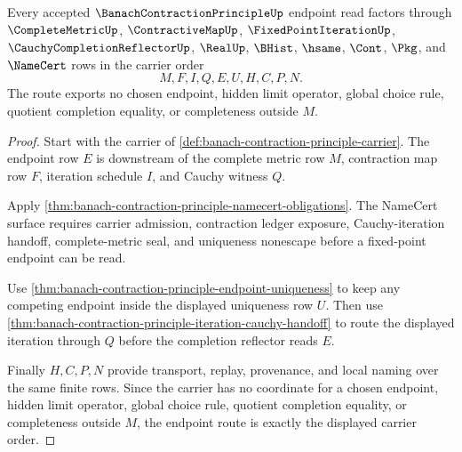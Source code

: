 \begin{theorem}
\label{thm:banach-contraction-principle-endpoint-route}
Every accepted $\BanachContractionPrincipleUp$ endpoint read factors through $\CompleteMetricUp$, $\ContractiveMapUp$, $\FixedPointIterationUp$, $\CauchyCompletionReflectorUp$, $\RealUp$, $\BHist$, $\hsame$, $\Cont$, $\Pkg$, and $\NameCert$ rows in the carrier order
$$
M,F,I,Q,E,U,H,C,P,N .
$$
The route exports no chosen endpoint, hidden limit operator, global choice rule, quotient completion equality, or completeness outside $M$.
\end{theorem}
\begin{proof}
Start with the carrier of \autoref{def:banach-contraction-principle-carrier}. The endpoint row $E$ is downstream of the complete metric row $M$, contraction map row $F$, iteration schedule $I$, and Cauchy witness $Q$.

Apply \autoref{thm:banach-contraction-principle-namecert-obligations}. The NameCert surface requires carrier admission, contraction ledger exposure, Cauchy-iteration handoff, complete-metric seal, and uniqueness nonescape before a fixed-point endpoint can be read.

Use \autoref{thm:banach-contraction-principle-endpoint-uniqueness} to keep any competing endpoint inside the displayed uniqueness row $U$. Then use \autoref{thm:banach-contraction-principle-iteration-cauchy-handoff} to route the displayed iteration through $Q$ before the completion reflector reads $E$.

Finally $H,C,P,N$ provide transport, replay, provenance, and local naming over the same finite rows. Since the carrier has no coordinate for a chosen endpoint, hidden limit operator, global choice rule, quotient completion equality, or completeness outside $M$, the endpoint route is exactly the displayed carrier order.
\end{proof}

\begin{closurestatus}{\BanachContractionPrincipleUp}
  \theoryclosure{\seedClosure}
  \formalstatus{\unformalizedV}
\end{closurestatus}
